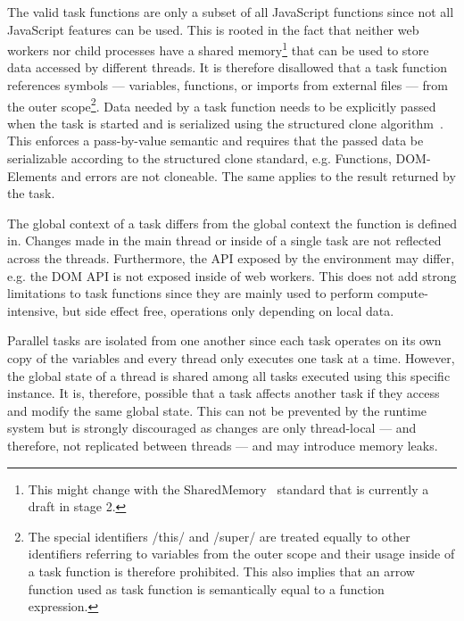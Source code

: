 The valid task functions are only a subset of all JavaScript functions since not all JavaScript features can be used. This is rooted in the fact that neither web workers nor child processes have a shared memory\footnote{This might change with the SharedMemory~\cite{Ecma2016} standard that is currently a draft in stage 2.} that can be used to store data accessed by different threads. It is therefore disallowed that a task function references symbols --- variables, functions, or imports from external files --- from the outer scope\footnote{The special identifiers \javascriptinline/this/ and \javascriptinline/super/ are treated equally to other identifiers referring to variables from the outer scope and their usage inside of a task function is therefore prohibited. This also implies that an arrow function used as task function is semantically equal to a function expression.}. Data needed by a task function needs to be explicitly passed when the task is started and is serialized using the structured clone algorithm~\cite[Section 2.9.4]{WHATWG2016}. This enforces a pass-by-value semantic and requires that the passed data be serializable according to the structured clone standard, e.g. Functions, DOM-Elements and errors are not cloneable. The same applies to the result returned by the task. 

The global context of a task differs from the global context the function is defined in. Changes made in the main thread or inside of a single task are not reflected across the threads. Furthermore, the API exposed by the environment may differ, e.g. the DOM API is not exposed inside of web workers. This does not add strong limitations to task functions since they are mainly used to perform compute-intensive, but side effect free,  operations only depending on local data.

Parallel tasks are isolated from one another since each task operates on its own copy of the variables and every thread only executes one task at a time. However, the global state of a thread is shared among all tasks executed using this specific instance. It is, therefore, possible that a task affects another task if they access and modify the same global state. This can not be prevented by the runtime system but is strongly discouraged as changes are only thread-local --- and therefore, not replicated between threads --- and may introduce memory leaks. 


